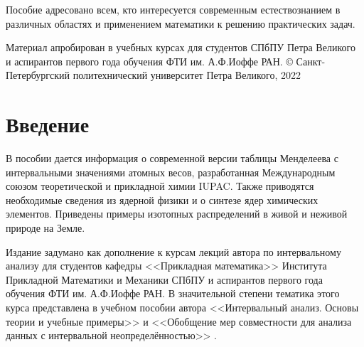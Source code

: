 \documentclass[a5paper,openany]{book}
\begin{document}
Пособие адресовано всем, кто интересуется современным естествознанием в различных областях и применением математики к решению практических задач.


Материал апробирован в учебных курсах для студентов 
СПбПУ Петра Великого и аспирантов первого года обучения ФТИ им. А.Ф.Иоффе РАН.
\hfill \break
\hfill \break
\hfill \break
\copyright 
Санкт-Петербургский политехнический университет Петра Великого, 2022




\tableofcontents      %

\listoffigures
\listoftables

\chapter{Введение}

\bigskip

В пособии дается информация о современной версии таблицы Менделеева с интервальными значениями атомных весов, разработанная Международным союзом теоретической 
и прикладной химии IUPAC. Также приводятся необходимые сведения из ядерной физики и о синтезе ядер химических элементов. Приведены примеры изотопных распределений в живой и неживой природе на Земле.

Издание задумано как дополнение к курсам лекций автора по интервальному анализу для студентов кафедры <<Прикладная математика>> Института Прикладной Математики и Механики СПбПУ и аспирантов первого года обучения ФТИ им. А.Ф.Иоффе РАН. В значительной степени тематика этого курса представлена в учебном пособии автора <<Интервальный анализ. Основы теории и учебные примеры>> \cite{Bazhenov2020} и <<Обобщение мер совместности для анализа данных с интервальной неопределённостью>> \cite{Bazhenov2022}.
\end{document}
